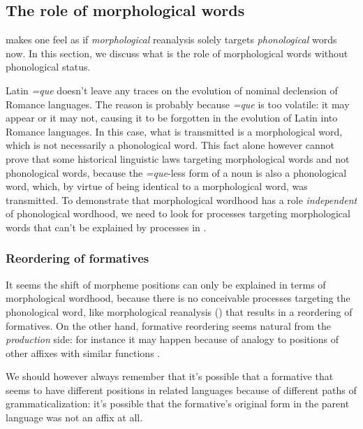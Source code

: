 \documentclass[a4paper, oneside, scheme=plain, 12pt]{article}
\newcommand*{\citepage}[1]{p.~{#1}}
\newcommand{\form}[1]{\emph{#1}}
\begin{document}
\subsection{The role of morphological words}

 makes one feel
as if \emph{morphological} reanalysis solely targets \emph{phonological} words now.
In this section, we discuss what is the role of morphological words without phonological status.

Latin \form{=que} doesn't leave any traces on the evolution of nominal declension of Romance languages.
The reason is probably because \form{=que} is too volatile:
it may appear or it may not, causing it to be forgotten in the evolution of Latin into Romance languages.
In this case, what is transmitted is a morphological word,
which is not necessarily a phonological word.
This fact alone however cannot prove that some historical linguistic laws targeting morphological words and not phonological words,
because the \form{=que}-less form of a noun is also a phonological word,
which, by virtue of being identical to a morphological word, was transmitted.
To demonstrate that morphological wordhood has a role \emph{independent} of phonological wordhood,
we need to look for processes targeting morphological words that can't be explained by 
processes in .

\subsubsection{Reordering of formatives}\label{sec:reordering-of-formative}

It seems the shift of morpheme positions can only be explained in terms of morphological wordhood,
because there is no conceivable processes targeting the phonological word,
like morphological reanalysis () that results in a reordering of formatives.
On the other hand, formative reordering seems natural from the \emph{production} side:
for instance it may happen because of analogy to positions of other affixes with similar functions
\citep[\citepage{252}]{campbell2013historical}.

We should however always remember that it's possible that
a formative that seems to have different positions in related languages
because of different paths of grammaticalization:
it's possible that the formative's original form in the parent language was not an affix at all.
\end{document}

